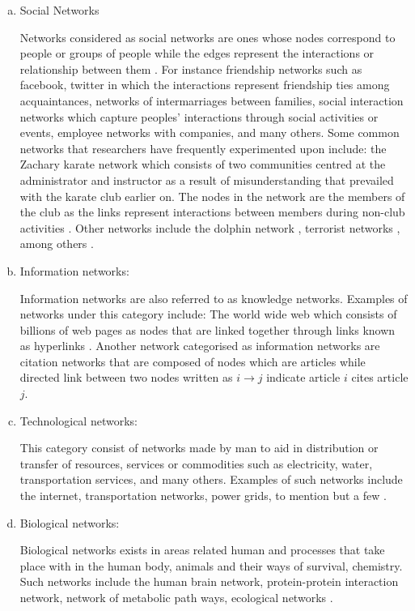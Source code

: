 \documentclass[10pt,a4paper]{article}
\theoremstyle{plain}
\theoremstyle{definition}
\begin{document}
\begin{enumerate}[a.]
	\item Social Networks
	
	Networks considered as social networks are ones whose nodes correspond to people or groups of people while the edges represent the interactions or relationship between them \citep{jackson2010social}. For instance friendship networks such as facebook, twitter in which the interactions represent friendship ties among acquaintances, networks of intermarriages between families, social interaction networks which capture peoples' interactions through social activities or events, employee networks with companies, and many others.
	Some common networks that researchers have frequently experimented upon include: the Zachary karate network which consists of two communities centred at the administrator and instructor as a result of misunderstanding that prevailed with the karate club earlier on. The nodes in the network are the members of the club as the links represent interactions between members during non-club activities \citep{zachary1977information}. Other networks include the dolphin network \citep{williams1993abundance}, terrorist networks \citep{magouirk2008connecting}, among others .
	
	\item Information networks: 
	
	Information networks are also referred to as knowledge networks. Examples of networks under this category include: 
	The world wide web which consists of billions of web pages as nodes that are linked together through links known as hyperlinks \citep{huberman2001laws}.
	Another network categorised as information networks are citation networks that are composed of nodes which are articles while directed link between two nodes written as $i\longrightarrow j$ indicate article $i$ cites article $j$.
	\item Technological networks:
	
	This category consist of networks made by man to aid in distribution or transfer of resources, services or commodities such as electricity, water, transportation services, and many others. Examples of such networks include the internet, transportation networks, power grids, to mention but a few \citep{faloutsos1999power,pagani2013power,banavar1999size}.
	\item Biological networks: 
	
	Biological networks exists in areas related human and processes that take place with in the human body, animals and their ways of survival, chemistry. Such networks include the human brain network, protein-protein interaction network, network of metabolic path ways, ecological networks \citep{estrada2011structure,sporns2004organization,schwikowski2000network}.
\end{enumerate}
\end{document}
